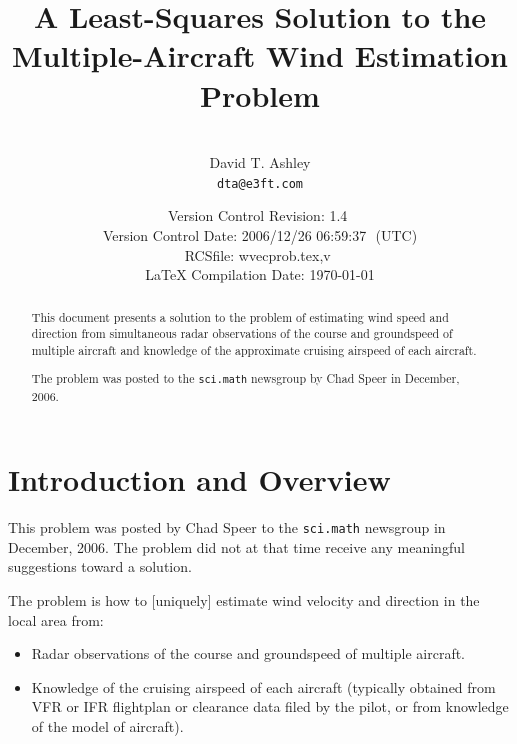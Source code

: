 \documentclass[letterpaper,10pt,titlepage]{article}
\begin{document}
\title{A Least-Squares Solution to the Multiple-Aircraft Wind Estimation Problem}
\author{\vspace{1cm}\\David T. Ashley\\\texttt{dta@e3ft.com}\\\vspace{1cm}}
\date{\vspace*{8mm}\small{Version Control $ $Revision: 1.4 $ $ \\
      Version Control $ $Date: 2006/12/26 06:59:37 $ $ (UTC) \\
      $ $RCSfile: wvecprob.tex,v $ $ \\
      \LaTeX{} Compilation Date: \today{}}}
\maketitle

%
\begin{abstract}
This document presents a solution to the problem of estimating
wind speed and direction from simultaneous radar observations of the
course and groundspeed of multiple aircraft and knowledge of the approximate
cruising airspeed of each aircraft.

The problem was posted to the \texttt{sci.math} newsgroup by
Chad Speer in December, 2006.
\end{abstract}


\section{Introduction and Overview}
\label{siov0}

This problem was posted by Chad Speer to the \texttt{sci.math} newsgroup
in December, 2006\@.  The problem did not at that time receive any meaningful
suggestions toward a solution.

The problem is how to [uniquely] estimate wind velocity and direction
in the local area from:

\begin{itemize}
\item Radar observations of the course and groundspeed of multiple aircraft.
\item Knowledge of the cruising airspeed of each aircraft (typically obtained from
      VFR or IFR flightplan or clearance data filed by the pilot, or from knowledge
      of the model of aircraft).
\end{itemize}
\end{document}
